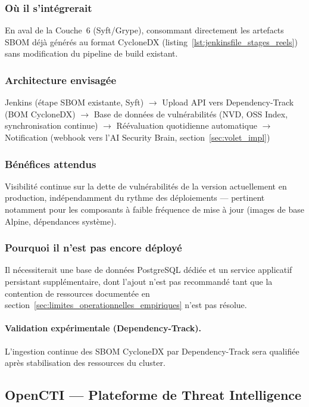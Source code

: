 \subsubsection{Où il s'intégrerait}
En aval de la Couche~6 (Syft/Grype), consommant directement les artefacts SBOM déjà générés au format CycloneDX (listing~\ref{lst:jenkinsfile_stages_reels}) sans modification du pipeline de build existant.

\subsubsection{Architecture envisagée}
\begin{center}
\scriptsize
Jenkins (étape SBOM existante, Syft) $\rightarrow$ Upload API vers Dependency-Track (BOM CycloneDX) $\rightarrow$ Base de données de vulnérabilités (NVD, OSS Index, synchronisation continue) $\rightarrow$ Réévaluation quotidienne automatique $\rightarrow$ Notification (webhook vers l'AI Security Brain, section~\ref{sec:volet_impl})
\end{center}

\subsubsection{Bénéfices attendus}
Visibilité continue sur la dette de vulnérabilités de la version actuellement en production, indépendamment du rythme des déploiements — pertinent notamment pour les composants à faible fréquence de mise à jour (images de base Alpine, dépendances système).

\subsubsection{Pourquoi il n'est pas encore déployé}
Il nécessiterait une base de données PostgreSQL dédiée et un service applicatif persistant supplémentaire, dont l'ajout n'est pas recommandé tant que la contention de ressources documentée en section~\ref{sec:limites_operationnelles_empiriques} n'est pas résolue.

\paragraph{Validation expérimentale (Dependency-Track).} L'ingestion continue des SBOM CycloneDX par Dependency-Track sera qualifiée après stabilisation des ressources du cluster.


\subsection{OpenCTI — Plateforme de Threat Intelligence}
\label{subsec:opencti_perspective}

